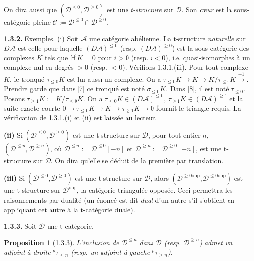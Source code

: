 \documentclass[12pt,a4paper]{article}
\theoremstyle{plain}
\newtheorem{proposition}[theorem]{Proposition}
\theoremstyle{definition}
\theoremstyle{remark}
\newcommand{\HH}{\mathbb{H}}
\newcommand{\cA}{\mathcal{A}}
\newcommand{\cC}{\mathcal{C}}
\newcommand{\cD}{\mathcal{D}}
\begin{document}
On dira aussi que $(\cD^{\leq 0}, \cD^{\geq 0})$ est une \emph{t-structure} sur $\cD$. Son \emph{cœur} est la sous-catégorie pleine $\cC := \cD^{\leq 0} \cap \cD^{\geq 0}$.

\smallskip

\noindent
\textbf{1.3.2.} Exemples. (i) Soit $\cA$ une catégorie abélienne. La t-structure \emph{naturelle} sur $D\cA$ est celle pour laquelle $(D\cA)^{\leq 0}$ (resp. $(D\cA)^{\geq 0}$) est la sous-catégorie des complexes $K$ tels que $\HH^{i}K = 0$ pour $i > 0$ (resp. $i < 0$), i.e. quasi-isomorphes à un complexe nul en degrés $> 0$ (resp. $< 0$). Vérifions 1.3.1.(iii). Pour tout complexe $K$, le tronqué $\tau_{\leq 0}K$ est lui aussi un complexe. On a $\tau_{\leq 0}K \to K \to K/\tau_{\leq 0}K \xrightarrow{+1}$. Prendre garde que dans [7] ce tronqué est noté $\sigma_{\leq 0}K$. Dans [8], il est noté $\tau_{\leq 0}$. Posons $\tau_{\geq 1}K := K/\tau_{\leq 0}K$. On a $\tau_{\leq 0}K \in (D\cA)^{\leq 0}$, $\tau_{\geq 1}K \in (D\cA)^{\geq 1}$ et la suite exacte courte $0 \to \tau_{\leq 0}K \to K \to \tau_{\geq 1}K \to 0$ fournit le triangle requis. La vérification de 1.3.1.(i) et (ii) est laissée au lecteur.

\smallskip

\noindent
\textbf{(ii)} Si $(\cD^{\leq 0}, \cD^{\geq 0})$ est une t-structure sur $\cD$, pour tout entier $n$, $(\cD^{\leq n}, \cD^{\geq n})$, où $\cD^{\leq n} := \cD^{\leq 0}[-n]$ et $\cD^{\geq n} := \cD^{\geq 0}[-n]$, est une t-structure sur $\cD$. On dira qu'elle se déduit de la première par translation.

\smallskip

\noindent
\textbf{(iii)} Si $(\cD^{\leq 0}, \cD^{\geq 0})$ est une t-structure sur $\cD$, alors $(\cD^{\geq 0\mathrm{opp}}, \cD^{\leq 0\mathrm{opp}})$ est une t-structure sur $\cD^{\mathrm{opp}}$, la catégorie triangulée opposée. Ceci permettra les raisonnements par dualité (un énoncé est dit \emph{dual} d'un autre s'il s'obtient en appliquant cet autre à la t-catégorie duale).

\smallskip

\noindent
\textbf{1.3.3.} Soit $\cD$ une t-catégorie.

\begin{proposition}[1.3.3]
L'inclusion de $\cD^{\leq n}$ dans $\cD$ (resp. $\cD^{\geq n}$) admet un adjoint à droite ${}^{p}\tau_{\leq n}$ (resp. un adjoint à gauche ${}^{p}\tau_{\geq n}$).
\end{proposition}

\smallskip
\end{document}
